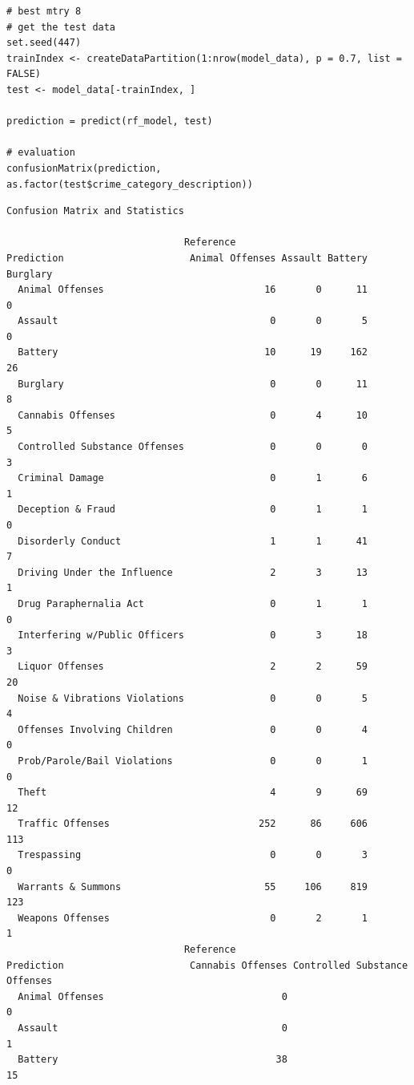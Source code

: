 \documentclass[
  article]{jss}
\begin{document}
\begin{verbatim}
# best mtry 8
# get the test data 
set.seed(447)
trainIndex <- createDataPartition(1:nrow(model_data), p = 0.7, list = FALSE)
test <- model_data[-trainIndex, ]

prediction = predict(rf_model, test)

# evaluation
confusionMatrix(prediction, as.factor(test$crime_category_description))
\end{verbatim}

\begin{verbatim}
Confusion Matrix and Statistics

                               Reference
Prediction                      Animal Offenses Assault Battery Burglary
  Animal Offenses                            16       0      11        0
  Assault                                     0       0       5        0
  Battery                                    10      19     162       26
  Burglary                                    0       0      11        8
  Cannabis Offenses                           0       4      10        5
  Controlled Substance Offenses               0       0       0        3
  Criminal Damage                             0       1       6        1
  Deception & Fraud                           0       1       1        0
  Disorderly Conduct                          1       1      41        7
  Driving Under the Influence                 2       3      13        1
  Drug Paraphernalia Act                      0       1       1        0
  Interfering w/Public Officers               0       3      18        3
  Liquor Offenses                             2       2      59       20
  Noise & Vibrations Violations               0       0       5        4
  Offenses Involving Children                 0       0       4        0
  Prob/Parole/Bail Violations                 0       0       1        0
  Theft                                       4       9      69       12
  Traffic Offenses                          252      86     606      113
  Trespassing                                 0       0       3        0
  Warrants & Summons                         55     106     819      123
  Weapons Offenses                            0       2       1        1
                               Reference
Prediction                      Cannabis Offenses Controlled Substance Offenses
  Animal Offenses                               0                             0
  Assault                                       0                             1
  Battery                                      38                            15

\end{verbatim}
\end{document}
